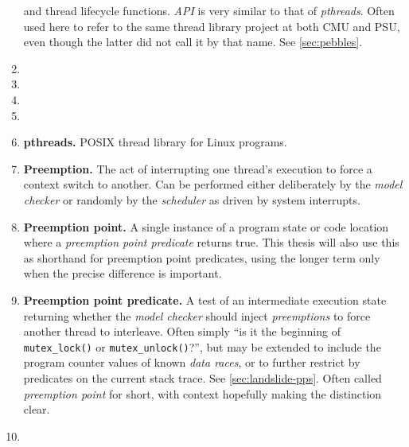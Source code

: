 \begin{enumerate}
		and thread lifecycle functions.
		{\em API} is very similar to that of {\em pthreads}.
		Often used here to refer to the same thread library project at both CMU and PSU,
		even though the latter did not call it by that name.
		See \cref{sec:pebbles}.
	\item {}
	\item {}
	\item {}
	\item {}
	\item {\bf pthreads.}
		POSIX thread library for Linux programs. %
	\item {\bf Preemption.}
		The act of interrupting one thread's execution to force a context switch to another.
		Can be performed either deliberately by the {\em model checker}
		or randomly by the {\em scheduler} as driven by system interrupts.
	\item {\bf Preemption point.}
		A single instance of a program state or code location where a {\em preemption point predicate} returns true.
		This thesis will also use this as shorthand for preemption point predicates,
		using the longer term only when the precise difference is important.
	\item {\bf Preemption point predicate.}
		A test of an intermediate execution state returning whether the {\em model checker}
		should inject {\em preemptions} to force another thread to interleave.
		Often simply ``is it the beginning of {\tt mutex\_lock()} or {\tt mutex\_unlock()}?'',
		but may be extended to include the program counter values of known {\em data races},
		or to further restrict by predicates on the current stack trace.
		See \cref{sec:landslide-pps}.
		Often called {\em preemption point} for short, with context hopefully making the distinction clear.
	\item {}

\end{enumerate}
